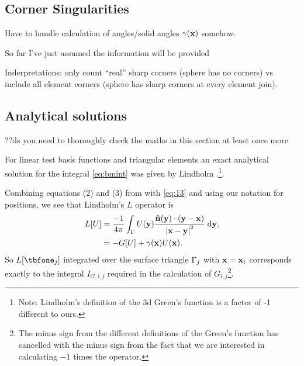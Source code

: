 \subsection{Corner Singularities}

Have to handle calculation of angles/solid angles $\gamma(\boldsymbol{\mathrm{x}})$ somehow.

So far I've just assumed the information will be provided

Inderpretations: only count ``real'' sharp corners (\ie sphere has no corners) vs include all element corners (\ie sphere has sharp corners at every element join).


\subsection{Analytical solutions}

??ds you need to thoroughly check the maths in this section at least once more

For linear test basis functions and triangular elements an exact analytical solution for the integral \cref{eq:bmint} was given by Lindholm \cite[App. B]{Lindholm1984}.\footnote{Note: Lindholm's definition of the 3d Green's function is a factor of -1 different to ours.}.

Combining equations (2) and (3) from \cite{Lindholm1984} with \cref{eq:13} and using our notation for positions, we see that Lindholm's $L$ operator is
\begin{equation}
  \begin{aligned}
    L[U] &= \frac{-1}{4 \pi}\int_{\Gamma} U(\boldsymbol{\mathrm{y}}) \frac{\boldsymbol{\mathrm{\hat{n}}}(\boldsymbol{\mathrm{y}}) \cdot (\boldsymbol{\mathrm{y}} -
      \boldsymbol{\mathrm{x}})}{\left|{\boldsymbol{\mathrm{x}} - \boldsymbol{\mathrm{y}}} \right|^2}
    {\; \mathrm{{d}}}\boldsymbol{\mathrm{y}}, \\
    &= -G[U] + \gamma(\boldsymbol{\mathrm{x}}) U(\boldsymbol{\mathrm{x}}).
  \end{aligned}
\end{equation}
So $L[\tbfone_{\ibasisb}]$ integrated over the surface triangle ${\Gamma}_{j}$ with $\boldsymbol{\mathrm{x}} = \boldsymbol{\mathrm{x}}_{i}$ corresponds exactly to the integral $I_{G,i,j}$ required in the calculation of $G_{i,j}$\footnote{The minus sign from the different definitions of the Green's function has cancelled with the minus sign from the fact that we are interested in calculating $-1$ times the operator.}.

